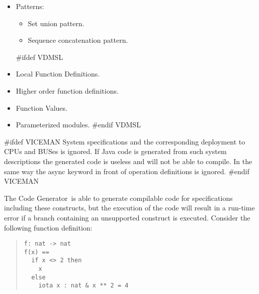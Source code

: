\documentclass[\pformat,11pt]{article}
\newcommand{\keyw}[1]{{\sf #1}}
\newcommand{\tcg}{the Code Generator}
\newcommand{\Tcg}{The Code Generator}
\begin{document}
\begin{itemize}
As an example the following expression is supported by \tcg :


\begin{quote}
\begin{verbatim}
let x in set numbers in x
\end{verbatim}
\end{quote}

whereas the following is not (caused by the type bind \verb+n: nat+):

\begin{quote}
\begin{verbatim}
let x: nat in x
\end{verbatim}
\end{quote}

\item Patterns:

  \begin{itemize}
  \item Set union pattern.
  \item Sequence concatenation pattern.
  \end{itemize}

#ifdef VDMSL
\item Local Function Definitions.

\item Higher order function definitions.
  
\item Function Values. 

\item Parameterized modules.
#endif VDMSL
\end{itemize}

#ifdef VICEMAN
System specifications and the corresponding deployment to CPUs and
BUSes is ignored. If Java code is generated from such system
descriptions the generated code is useless and will not be able to
compile. In the same way the \keyw{async} keyword in front of
operation definitions is ignored.
#endif VICEMAN

\Tcg\ is able to generate compilable code for
specifications including these constructs, but the execution of the
code will result in a run-time error if a branch containing an
unsupported construct is executed. Consider the following function
definition:

\begin{quote}
\begin{verbatim}
f: nat -> nat
f(x) ==
  if x <> 2 then
    x
  else
    iota x : nat & x ** 2 = 4
\end{verbatim}
\end{quote}
\end{document}
